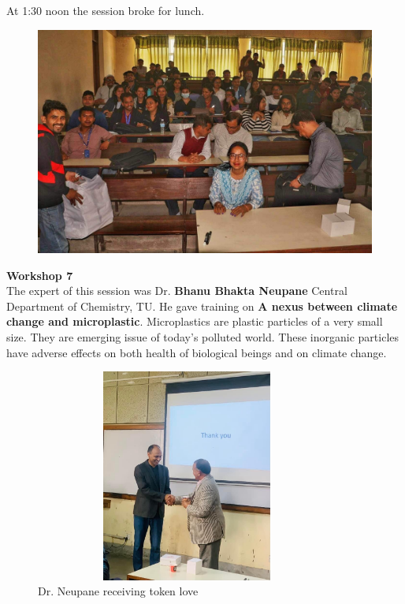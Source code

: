 \documentclass[a4paper,12pt]{report}
\begin{document}
\vspace{7mm}

At 1:30 noon the session broke for lunch.
\vspace{5mm}

\begin{figure}[h!]
  \centering
  \includegraphics[width=13cm, height=7.5cm]{lunch1.jpeg}
\end{figure}
\clearpage

{\bfseries \large Workshop 7}\\[3mm]
The expert of this session was Dr. \textbf{Bhanu Bhakta Neupane} Central Department of Chemistry, TU. He gave training on \textbf{A nexus between climate change and microplastic}. Microplastics are plastic particles of a very small size. They are emerging issue of today's polluted world. These inorganic particles have adverse effects on both health of biological beings and on climate change.

\vspace{10mm}
\begin{figure}[h!]
  \centering
  \includegraphics[width=10cm, height=7cm]{neupane.jpeg}
  \caption{Dr. Neupane receiving token love}
\end{figure}
\end{document}
